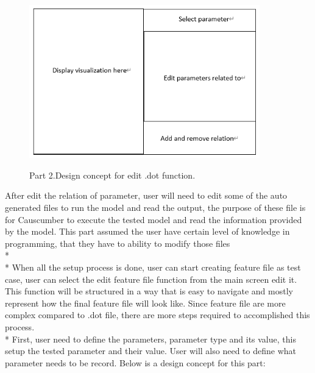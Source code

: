 \begin{figure}[H]
	\centering
	\includegraphics[width=10cm]{figures/editDot2.png}\\
	\caption{Part 2.Design concept for edit .dot function.}
	\label{fig:figure6}
\end{figure}
After edit the relation of parameter, user will need to edit some of the auto generated files to run the model and read the output, the purpose of these file is for Causcumber to execute the tested model and read the information provided by the model. This part assumed the user have certain level of knowledge in programming, that they have to ability to modify those files\\*\\*
When all the setup process is done, user can start creating feature file as test case, user can select the edit feature file function from the main screen edit it. This function will be structured in a way that is easy to navigate and mostly represent how the final feature file will look like. Since feature file are more complex compared to .dot file, there are more steps required to accomplished this process. \\*
First, user need to define the parameters, parameter type and its value, this setup the tested parameter and their value. User will also need to define what parameter needs to be record. Below is a design concept for this part: 

